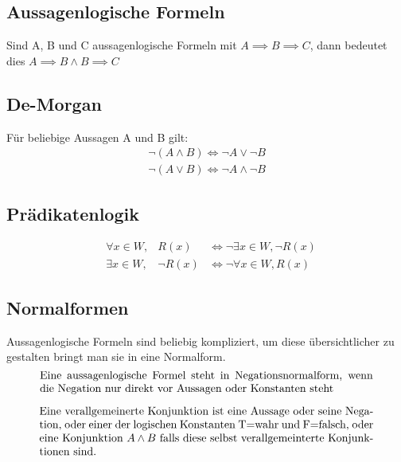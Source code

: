 \subsection{Aussagenlogische Formeln}
Sind A, B und C aussagenlogische Formeln mit \(A \implies B \implies C \), dann bedeutet dies \( A \implies B \land B \implies C \)
\subsection{De-Morgan}
Für beliebige Aussagen A und B gilt:
\begin{equation}
    \begin{split}
        \lnot(A \land B) \Leftrightarrow \lnot A \lor \lnot B \\
        \lnot(A \lor B) \Leftrightarrow \lnot A \land \lnot B 
    \end{split}
\end{equation}
\subsection{Prädikatenlogik}
\begin{equation}
    \begin{aligned}
        &\forall x \in W, &R(x) &\Leftrightarrow \lnot \exists x \in W, \lnot R(x)\\
        &\exists x \in W, &\lnot R(x) &\Leftrightarrow \lnot \forall x \in W, R(x)
    \end{aligned}
\end{equation}

\subsection{Normalformen}
Aussagenlogische Formeln sind beliebig kompliziert, um diese übersichtlicher zu gestalten bringt man sie in eine Normalform.
\begin{equation}
    \parbox{30em}{Eine aussagenlogische Formel steht in Negationsnormalform,
    wenn die Negation nur direkt vor Aussagen oder Konstanten steht}
\end{equation}

\begin{equation}
    \parbox{30em}{Eine verallgemeinerte Konjunktion ist eine Aussage oder seine Negation, 
    oder einer der logischen Konstanten T=wahr und F=falsch, 
    oder eine Konjunktion \(A \land B \) falls diese selbst 
    verallgemeinterte Konjunktionen sind.}
\end{equation}

